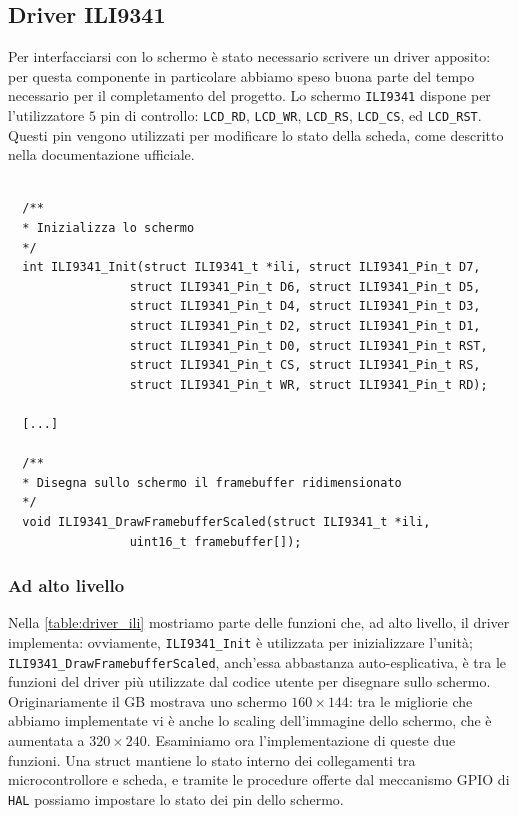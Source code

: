 \documentclass[hidelinks,12pt]{article}
\begin{document}
\subsection{Driver ILI9341}
Per interfacciarsi con lo schermo è stato necessario scrivere un driver
apposito: per questa componente in particolare abbiamo speso buona parte del
tempo necessario per il completamento del progetto. Lo schermo \texttt{ILI9341}
dispone per l'utilizzatore $5$ pin di controllo: \texttt{LCD\_RD},
\texttt{LCD\_WR}, \texttt{LCD\_RS}, \texttt{LCD\_CS}, ed \texttt{LCD\_RST}.
Questi pin vengono utilizzati per modificare lo stato della scheda, come
descritto nella documentazione ufficiale.
\begin{table}[h]
	\begin{verbatim}

  /**
  * Inizializza lo schermo
  */
  int ILI9341_Init(struct ILI9341_t *ili, struct ILI9341_Pin_t D7,
                 struct ILI9341_Pin_t D6, struct ILI9341_Pin_t D5,
                 struct ILI9341_Pin_t D4, struct ILI9341_Pin_t D3,
                 struct ILI9341_Pin_t D2, struct ILI9341_Pin_t D1,
                 struct ILI9341_Pin_t D0, struct ILI9341_Pin_t RST,
                 struct ILI9341_Pin_t CS, struct ILI9341_Pin_t RS,
                 struct ILI9341_Pin_t WR, struct ILI9341_Pin_t RD);

  [...]

  /**
  * Disegna sullo schermo il framebuffer ridimensionato
  */
  void ILI9341_DrawFramebufferScaled(struct ILI9341_t *ili, 
                 uint16_t framebuffer[]);
  \end{verbatim}
	\caption{}
	\label{table:driver_ili}
\end{table}
\subsubsection{Ad alto livello}
Nella \cref{table:driver_ili} mostriamo parte delle funzioni che, ad alto
livello, il driver implementa: ovviamente, \texttt{ILI9341\_Init} è utilizzata
per inizializzare l'unità; \texttt{ILI9341\_DrawFramebufferScaled}, anch'essa
abbastanza auto-esplicativa, è tra le funzioni del driver più utilizzate dal
codice utente per disegnare sullo schermo. Originariamente il GB mostrava uno
schermo $160\times144$: tra le migliorie che abbiamo implementate vi è anche lo
scaling dell'immagine dello schermo, che è aumentata a $320\times240$.
Esaminiamo ora l'implementazione di queste due funzioni. Una struct mantiene lo
stato interno dei collegamenti tra microcontrollore e scheda, e tramite le
procedure offerte dal meccanismo GPIO di \texttt{HAL} possiamo impostare lo
stato dei pin dello schermo.
\end{document}
